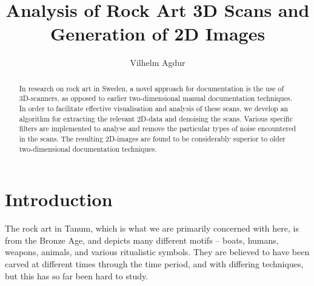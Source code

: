 \documentclass[a4paper,reqno,oneside]{amsart} %
\theoremstyle{definition}
\theoremstyle{remark}
\numberwithin{equation}{section}
\begin{document}
\lstset{language=matlab}

\title{Analysis of Rock Art 3D Scans and Generation of 2D Images}

\author{Vilhelm Agdur}






\begin{abstract}
In research on rock art in Sweden, a novel approach for documentation is the use of 3D-scanners, as opposed to earlier two-dimensional manual documentation techniques. In order to facilitate effective visualisation and analysis of these scans, we develop an algorithm for extracting the relevant 2D-data and denoising the scans. Various specific filters are implemented to analyse and remove the particular types of noise encountered in the scans. The resulting 2D-images are found to be considerably superior to older two-dimensional documentation techniques.\end{abstract}

\maketitle

\section{Introduction}

The rock art in Tanum, which is what we are primarily concerned with here, is from the Bronze Age, and depicts many different motifs -- boats, humans, weapons, animals, and various ritualistic symbols. They are believed to have been carved at different times through the time period, and with differing techniques, but this has so far been hard to study.\cite{ling_bertilsson_2015} 
\end{document}
